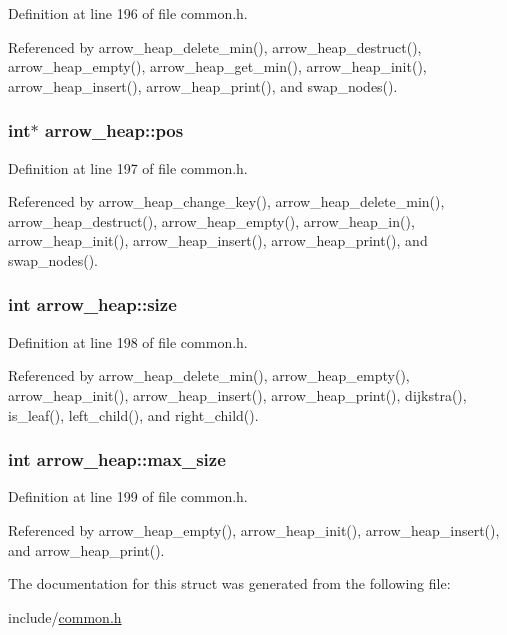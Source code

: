 Definition at line 196 of file common.h.

Referenced by arrow\_\-heap\_\-delete\_\-min(), arrow\_\-heap\_\-destruct(), arrow\_\-heap\_\-empty(), arrow\_\-heap\_\-get\_\-min(), arrow\_\-heap\_\-init(), arrow\_\-heap\_\-insert(), arrow\_\-heap\_\-print(), and swap\_\-nodes().\hypertarget{structarrow__heap_a39c7b18964b26c78a96f51406d8d7ab}{
\subsubsection{\setlength{\rightskip}{0pt plus 5cm}int$\ast$ {\bf arrow\_\-heap::pos}}}
\label{structarrow__heap_a39c7b18964b26c78a96f51406d8d7ab}




Definition at line 197 of file common.h.

Referenced by arrow\_\-heap\_\-change\_\-key(), arrow\_\-heap\_\-delete\_\-min(), arrow\_\-heap\_\-destruct(), arrow\_\-heap\_\-empty(), arrow\_\-heap\_\-in(), arrow\_\-heap\_\-init(), arrow\_\-heap\_\-insert(), arrow\_\-heap\_\-print(), and swap\_\-nodes().\hypertarget{structarrow__heap_afeff09d63b1f6ec6fc910d3407972de}{
\subsubsection{\setlength{\rightskip}{0pt plus 5cm}int {\bf arrow\_\-heap::size}}}
\label{structarrow__heap_afeff09d63b1f6ec6fc910d3407972de}




Definition at line 198 of file common.h.

Referenced by arrow\_\-heap\_\-delete\_\-min(), arrow\_\-heap\_\-empty(), arrow\_\-heap\_\-init(), arrow\_\-heap\_\-insert(), arrow\_\-heap\_\-print(), dijkstra(), is\_\-leaf(), left\_\-child(), and right\_\-child().\hypertarget{structarrow__heap_e668dd3f450ba07df5998b8d084e6949}{
\subsubsection{\setlength{\rightskip}{0pt plus 5cm}int {\bf arrow\_\-heap::max\_\-size}}}
\label{structarrow__heap_e668dd3f450ba07df5998b8d084e6949}




Definition at line 199 of file common.h.

Referenced by arrow\_\-heap\_\-empty(), arrow\_\-heap\_\-init(), arrow\_\-heap\_\-insert(), and arrow\_\-heap\_\-print().

The documentation for this struct was generated from the following file:\begin{CompactItemize}
\item 
include/\hyperlink{common_8h}{common.h}\end{CompactItemize}
